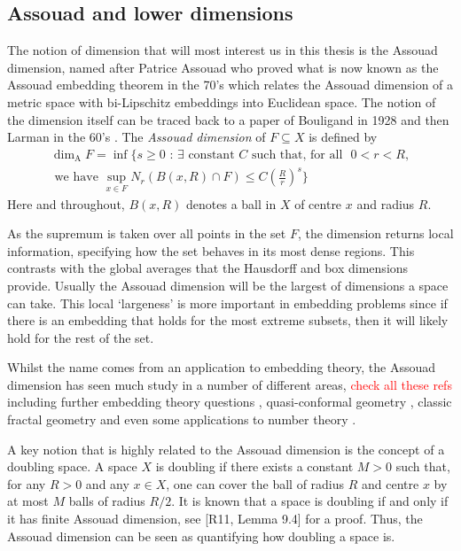 \subsection{Assouad and lower dimensions}
\label{sec:intro-ass}

The notion of dimension that will most interest us in this thesis is the Assouad dimension, named after Patrice Assouad who proved what is now known as the Assouad embedding theorem in the 70's \cite{assouad1, assouad2} which relates the Assouad dimension of a metric space with bi-Lipschitz embeddings into Euclidean space. The notion of the dimension itself can be traced back to a paper of Bouligand in 1928 \cite{bouligand} and then Larman in the 60's \cite{larman1,larman2}. The \textit{Assouad dimension} of $F \subseteq X$ is defined by 
\begin{multline*}
\dim_{\text{A}} F = \inf \Bigg\{ s \geq 0 \, \,  : \, \exists \text{ constant } C \text{ such that, for all } \, \, 0< r< R,\\ \text{ we have  }\sup_{x\in F} N_r (B(x,R)\cap F) \leq C\left(\frac{R}{r}\right)^{s} \Bigg\}
\end{multline*}
Here and throughout, $B(x,R)$ denotes a ball in $X$ of centre $x$ and radius $R$.

As the supremum is taken over all points in the set $F$, the dimension returns local information, specifying how the set behaves in its most dense regions. This contrasts with the global averages that the Hausdorff and box dimensions provide. Usually the Assouad dimension will be the largest of dimensions a space can take. This local `largeness' is more important in embedding problems since if there is an embedding that holds for the most extreme subsets, then it will likely hold for the rest of the set. 

Whilst the name comes from an application to embedding theory, the Assouad dimension has seen much study in a number of different areas, \textcolor{red}{check all these refs} including further embedding theory questions \cite{olson02, olson10, robinson11}, quasi-conformal geometry \cite{heinonen, tyson, mckay-tyson}, classic fractal geometry \cite{fraser-todd, yu, troscheit, kaenmaki, orponen, etc} and even some applications to number theory \cite{fraser-yu, saito, etc }. 

A key notion that is highly related to the Assouad dimension is the concept of a doubling space. A space $X$ is doubling if there exists a constant $M > 0$ such that, for any $R > 0$ and any $x \in X$, one can cover the ball of radius $R$ and centre $x$ by at most $M$ balls of radius $R/2$. It is known that a space is doubling if and only if it has finite Assouad dimension, see \cite{robinson-book}[R11, Lemma 9.4] for a proof. Thus, the Assouad dimension can be seen as quantifying how doubling a space is.

